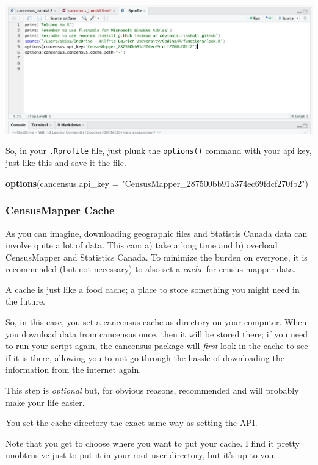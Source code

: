 \documentclass[
]{article}
\newenvironment{Shaded}{\begin{snugshade}}{\end{snugshade}}
\newcommand{\DataTypeTok}[1]{\textcolor[rgb]{0.13,0.29,0.53}{#1}}
\newcommand{\KeywordTok}[1]{\textcolor[rgb]{0.13,0.29,0.53}{\textbf{#1}}}
\newcommand{\NormalTok}[1]{#1}
\newcommand{\StringTok}[1]{\textcolor[rgb]{0.31,0.60,0.02}{#1}}
\begin{document}
\begin{center}\includegraphics[width=0.5\linewidth]{images/rprofile} \end{center}

So, in your \texttt{.Rprofile} file, just plunk the \texttt{options()}
command with your api key, just like this and save it the file.

\begin{Shaded}
\begin{Highlighting}[]
\KeywordTok{options}\NormalTok{(}\DataTypeTok{cancensus.api\_key =} \StringTok{"CensusMapper\_287500bb91a374ec69fdcf270fb2"}\NormalTok{)}
\end{Highlighting}
\end{Shaded}

\hypertarget{censusmapper-cache}{%
\subsubsection{CensusMapper Cache}\label{censusmapper-cache}}

As you can imagine, downloading geographic files and Statistis Canada
data can involve quite a lot of data. This can: a) take a long time and
b) overload CensusMapper and Statistics Canada. To minimize the burden
on everyone, it is recommended (but not necessary) to also set a
\emph{cache} for census mapper data.

A cache is just like a food cache; a place to store something you might
need in the future.

So, in this case, you set a cancensus cache as directory on your
computer. When you download data from cancensus once, then it will be
stored there; if you need to run your script again, the cancensus
package will \emph{first} look in the cache to see if it is there,
allowing you to not go through the hassle of downloading the information
from the internet again.

This step is \emph{optional} but, for obvious reasons, recommended and
will probably make your life easier.

You set the cache directory the exact same way as setting the API.

Note that you get to choose where you want to put your cache. I find it
pretty unobtrusive just to put it in your root user directory, but it's
up to you.
\end{document}
